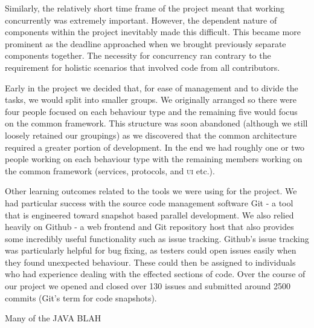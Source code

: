 Similarly, the relatively short time frame of the project meant that working concurrently was extremely important. However, the dependent nature of components within the project inevitably made this difficult. This became more prominent as the deadline approached when we brought previously separate components together. The necessity for concurrency ran contrary to the requirement for holistic scenarios that involved code from all contributors.

Early in the project we decided that, for ease of management and to divide the tasks, we would split into smaller groups. We originally arranged so there were four people focused on each behaviour type and the remaining five would focus on the common framework. This structure was soon abandoned (although we still loosely retained our groupings) as we discovered that the common architecture required a greater portion of development. In the end we had roughly one or two people working on each behaviour type with the remaining members working on the common framework (services, protocols, and \textsc{ui} etc.). 

Other learning outcomes related to the tools we were using for the project. We had particular success with the source code management software Git - a tool that is engineered toward snapshot based parallel development. We also relied heavily on Github - a web frontend and Git repository host that also provides some incredibly useful functionality such as issue tracking. Github's issue tracking was particularly helpful for bug fixing, as testers could open issues easily when they found unexpected behaviour. These could then be assigned to individuals who had experience dealing with the effected sections of code. Over the course of our project we opened and closed over 130 issues and submitted around 2500 commits (Git's term for code snapshots).

Many of the JAVA BLAH
